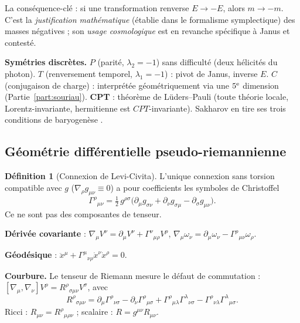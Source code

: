 \documentclass[11pt,a4paper]{article}
\theoremstyle{definition}
\newtheorem{definition}{Définition}[section]
\theoremstyle{plain}
\newcommand{\half}{\tfrac{1}{2}}
\begin{document}
La conséquence-clé : si une transformation renverse $E\to-E$, alors $m\to-m$. C'est la
\emph{justification mathématique} (établie dans le formalisme symplectique) des masses
négatives ; son \emph{usage cosmologique} est en revanche spécifique à Janus et contesté.

\textbf{Symétries discrètes.} $P$ (parité, $\lambda_2=-1$) sans difficulté (deux hélicités du
photon). $T$ (renversement temporel, $\lambda_1=-1$) : pivot de Janus, inverse $E$.
$C$ (conjugaison de charge) : interprétée géométriquement via une $5^{\text e}$ dimension
(Partie~\ref{part:souriau}). \textbf{CPT} : théorème de Lüders–Pauli (toute théorie locale,
Lorentz-invariante, hermitienne est $CPT$-invariante). Sakharov en tire ses trois conditions
de baryogenèse \cite{Sakharov1967}.

\subsection{Géométrie différentielle pseudo-riemannienne}

\begin{definition}[Connexion de Levi-Civita]
L'unique connexion sans torsion compatible avec $g$ ($\nabla_\rho g_{\mu\nu}\equiv0$) a pour
coefficients les symboles de Christoffel
\begin{equation}
\Gamma^\rho{}_{\mu\nu}=\half\,g^{\rho\sigma}
\bigl(\partial_\mu g_{\sigma\nu}+\partial_\nu g_{\sigma\mu}-\partial_\sigma g_{\mu\nu}\bigr).
\label{eq:christoffel}
\end{equation}
Ce ne sont pas des composantes de tenseur.
\end{definition}

\textbf{Dérivée covariante} : $\nabla_\mu V^\nu=\partial_\mu V^\nu+\Gamma^\nu{}_{\mu\rho}V^\rho$,
$\nabla_\mu\omega_\nu=\partial_\mu\omega_\nu-\Gamma^\rho{}_{\mu\nu}\omega_\rho$.

\textbf{Géodésique} : $\ddot x^\mu+\Gamma^\mu{}_{\nu\rho}\dot x^\nu\dot x^\rho=0$.

\textbf{Courbure.} Le tenseur de Riemann mesure le défaut de commutation :
$[\nabla_\mu,\nabla_\nu]V^\rho=R^\rho{}_{\sigma\mu\nu}V^\sigma$, avec
\begin{equation}
R^\rho{}_{\sigma\mu\nu}=\partial_\mu\Gamma^\rho{}_{\nu\sigma}-\partial_\nu\Gamma^\rho{}_{\mu\sigma}
+\Gamma^\rho{}_{\mu\lambda}\Gamma^\lambda{}_{\nu\sigma}
-\Gamma^\rho{}_{\nu\lambda}\Gamma^\lambda{}_{\mu\sigma}.
\end{equation}
Ricci : $R_{\mu\nu}=R^\rho{}_{\mu\rho\nu}$ ; scalaire : $R=g^{\mu\nu}R_{\mu\nu}$.
\end{document}
